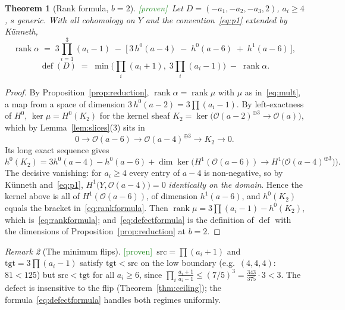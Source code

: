 \documentclass[11pt]{article}
\theoremstyle{plain}
\newtheorem{theorem}{Theorem}[section]
\theoremstyle{definition}
\theoremstyle{remark}
\newtheorem{remark}[theorem]{Remark}
\newcommand{\Proven}{\textcolor{ForestGreen}{\textsf{[proven]}}}
\newcommand{\cO}{\mathcal{O}}
\newcommand{\rank}{\operatorname{rank}}
\newcommand{\defect}{\operatorname{def}}
\DeclareMathOperator{\Ker}{ker}
\begin{document}
\begin{theorem}[Rank formula, $b=2$]\label{thm:rank}
\Proven\ Let $D=(-a_1,-a_2,-a_3,2)$, $a_i\ge 4$, $s$ generic. With all cohomology on $Y$ and the convention~\eqref{eq:p1} extended by K\"unneth,
\begin{equation}\label{eq:rankformula}
\rank\alpha \;=\; 3\prod_{i=1}^{3}(a_i-1)\;-\;\Big[\,3\,h^0(a-4)\;-\;h^0(a-6)\;+\;h^1(a-6)\,\Big],
\end{equation}
\begin{equation}\label{eq:defectformula}
\defect(D)\;=\;\min\!\Big(\textstyle\prod_i(a_i+1),\;3\prod_i(a_i-1)\Big)\;-\;\rank\alpha .
\end{equation}
\end{theorem}

\begin{proof}
By Proposition~\ref{prop:reduction}, $\rank\alpha=\rank\mu$ with $\mu$ as in~\eqref{eq:mult}, a map from a space of dimension $3\,h^0(a-2)=3\prod(a_i-1)$. By left-exactness of $H^0$, $\Ker\mu=H^0(K_2)$ for the kernel sheaf $K_2=\Ker\big(\cO(a-2)^{\oplus3}\to\cO(a)\big)$, which by Lemma~\ref{lem:slices}(3) sits in
\[
0\to\cO(a-6)\to\cO(a-4)^{\oplus 3}\to K_2\to 0 .
\]
Its long exact sequence gives
\[
h^0(K_2)=3h^0(a-4)-h^0(a-6)+\dim\Ker\!\Big(H^1(\cO(a-6))\to H^1\big(\cO(a-4)^{\oplus3}\big)\Big).
\]
The decisive vanishing: for $a_i\ge 4$ every entry of $a-4$ is non-negative, so by K\"unneth and~\eqref{eq:p1}, $H^1\big(Y,\cO(a-4)\big)=0$ \emph{identically on the domain}. Hence the kernel above is all of $H^1(\cO(a-6))$, of dimension $h^1(a-6)$, and $h^0(K_2)$ equals the bracket in~\eqref{eq:rankformula}. Then $\rank\mu=3\prod(a_i-1)-h^0(K_2)$, which is~\eqref{eq:rankformula}; and~\eqref{eq:defectformula} is the definition of $\defect$ with the dimensions of Proposition~\ref{prop:reduction} at $b=2$.
\end{proof}

\begin{remark}[The minimum flips]\label{rem:minflip}
\Proven\ $\mathrm{src}=\prod(a_i+1)$ and $\mathrm{tgt}=3\prod(a_i-1)$ satisfy $\mathrm{tgt}<\mathrm{src}$ on the low boundary (e.g.\ $(4,4,4)$: $81<125$) but $\mathrm{src}<\mathrm{tgt}$ for all $a_i\ge 6$, since $\prod_i\frac{a_i+1}{a_i-1}\le(7/5)^3=\frac{343}{375}\cdot 3<3$. The defect is insensitive to the flip (Theorem~\ref{thm:ceiling}); the formula~\eqref{eq:defectformula} handles both regimes uniformly.
\end{remark}
\end{document}
